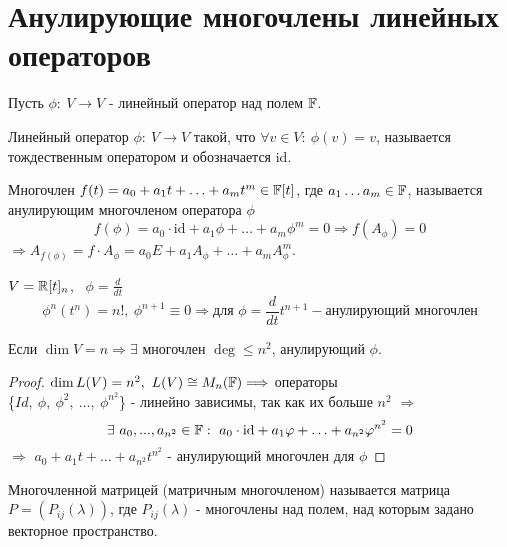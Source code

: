 \section{Анулирующие многочлены линейных операторов}
    Пусть $\phi: \ V\to V$ - линейный оператор над полем $\mathbb{F}$.
    \begin{definition}
        Линейный оператор $\phi: \ V\to V$ такой, что $\forall v\in V: \ \phi(v) = v$, называется тождественным оператором и обозначается id.
    \end{definition}
    \begin{definition}
        Многочлен $f(t) = a_0+a_1t+\ldots+a_mt^m\in\mathbb{F}[t]$, где $a_1\ldots a_m\in\mathbb{F}$, называется анулирующим многочленом оператора $\phi$ 
        $$f(\phi) = a_0\cdot\text{id}+a_1\phi+\ldots+a_m\phi^m = 0 \Longrightarrow f(A_{\phi}) = 0$$
        $\Longrightarrow A_{f(\phi)} = f\cdot A_{\phi} = a_0E+a_1A_{\phi}+\ldots+a_mA_{\phi}^m$.
    \end{definition}
    \begin{example1}
        $V = \mathbb{R}[t]_n$, \ $\phi = \frac{d}{dt}$
        $$\phi^n(t^n) = n!, \ \phi^{n+1}\equiv0 \Longrightarrow \text{для } \phi = \frac{d}{dt} t^{n+1} - \text{анулирующий многочлен}$$
    \end{example1}
    \begin{subtheorem}
        Если $\dim V = n \Longrightarrow \exists$ многочлен $\deg \leq n^2$, анулирующий $\phi$.
    \end{subtheorem}
    \begin{proof}
        $\dim L(V) = n^2, \ L(V) \cong M_n(\mathbb{F}) \Longrightarrow$ операторы \\ \{$Id, \ \phi, \ \phi^2, \ \ldots, \ \phi^{n^2}$\} - линейно зависимы, так как их больше $n^2$ $\Longrightarrow$
        $$\exists \ a_0,...,a_{n^2} \in \mathbb{F}: \ a_0 \cdot \text{id}+a_1\varphi+\ldots+a_{n^2}\varphi^{n^2} = 0$$ 
        $\Longrightarrow$ $a_0+a_1t+\ldots+a_{n^2}t^{n^2}$ - анулирующий многочлен для $\phi$
    \end{proof}
    \begin{definition}
        Многочленной матрицей (матричным многочленом) называется матрица $P = (P_{ij}(\lambda))$, где $P_{ij}(\lambda)$ - многочлены над полем, над которым задано векторное пространство.
    \end{definition}
